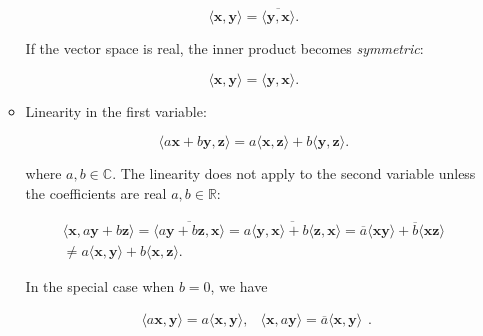 \documentclass[10pt,b5paper,titlepage]{book}
\begin{document}
\begin{itemize}
\begin{itemize}
                \begin{equation}
                    \langle \mathbf{x}, \mathbf{y} \rangle
                    = \overline{\langle \mathbf{y}, \mathbf{x} \rangle}
                .\end{equation}

                If the vector space is real, the inner product becomes \textit{symmetric}:

                \begin{equation}
                    \langle \mathbf{x}, \mathbf{y} \rangle
                    = \langle \mathbf{y}, \mathbf{x} \rangle
                .\end{equation}

            \item Linearity in the first variable:

                \begin{equation}
                    \langle a \mathbf{x} + b \mathbf{y}, \mathbf{z} \rangle
                    = a \langle \mathbf{x}, \mathbf{z} \rangle
                    + b \langle \mathbf{y}, \mathbf{z} \rangle
                .\end{equation}

                where $a, b \in \mathbb{C}$. The linearity does not apply
                to the second variable unless the coefficients are real
                $a, b \in \mathbb{R}$:

                \begin{equation}
                    \begin{array}{l}
                        \langle \mathbf{x}, a \mathbf{y} + b \mathbf{z} \rangle
                        = \overline{\langle a \mathbf{y} + b \mathbf{z}, \mathbf{x} \rangle}
                        = \overline{a \langle \mathbf{y}, \mathbf{x} \rangle + b \langle \mathbf{z}, \mathbf{x} \rangle}
                        = \overline{a} \langle \mathbf{x} \mathbf{y} \rangle
                        + \overline{b} \langle \mathbf{x} \mathbf{z} \rangle \\
                        \neq a \langle \mathbf{x}, \mathbf{y} \rangle
                        + b \langle \mathbf{x}, \mathbf{z} \rangle.
                    \end{array}
                \end{equation}

                In the special case when $b=0$, we have

                \begin{equation}
                    \begin{array}{lr}
                        \langle a \mathbf{x}, \mathbf{y} \rangle
                        = a \langle \mathbf{x}, \mathbf{y} \rangle, &
                        \langle \mathbf{x}, a \mathbf{y} \rangle
                        = \overline{a} \langle \mathbf{x}, \mathbf{y} \rangle
                    \end{array}
                .\end{equation}


\end{itemize}
\end{itemize}
\end{document}
